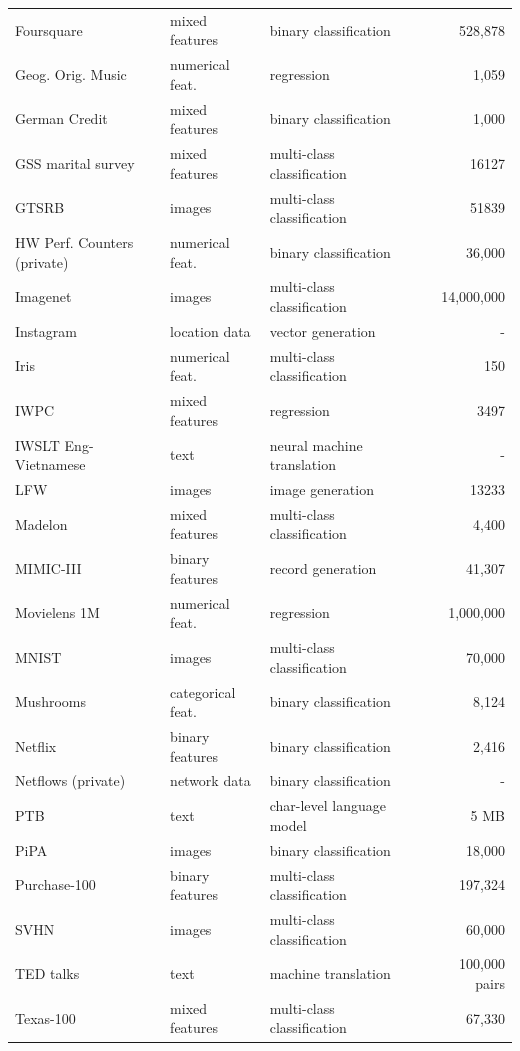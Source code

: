 \begin{table}[!t]
\begin{tabular}{p{3cm} p{2cm} p{3.2cm} p{2.5cm} r}
Foursquare~ & mixed features & binary classification &  & 528,878 \\
Geog. Orig. Music~ & numerical feat. & regression &  & 1,059 \\
German Credit~ & mixed features & binary classification &  & 1,000 \\
GSS marital survey~ & mixed features & multi-class classification &  & 16127 \\
GTSRB~ & images & multi-class classification &  & 51839\\
HW Perf. Counters (private) & numerical feat. & binary classification &  & 36,000 \\
Imagenet~ & images & multi-class classification &  & 14,000,000 \\
Instagram~ & location data & vector generation &  & - \\
Iris~ & numerical feat. & multi-class classification &  & 150 \\
IWPC~ & mixed features & regression &  & 3497 \\
IWSLT Eng-Vietnamese~ & text & neural machine translation &  & - \\
LFW~& images & image generation &  & 13233 \\ 
Madelon~ & mixed features & multi-class classification &  & 4,400 \\
MIMIC-III~ & binary features & record generation &  & 41,307 \\
Movielens 1M~ & numerical feat. & regression &  & 1,000,000 \\
MNIST~ & images & multi-class classification &  & 70,000 \\
Mushrooms~ & categorical feat. & binary classification &  & 8,124 \\
Netflix~ & binary features & binary classification &  & 2,416 \\
Netflows (private) & network data & binary classification &  & - \\
PTB~ & text & char-level language model &  & 5 MB \\
PiPA~ & images & binary classification &  & 18,000 \\
Purchase-100~ & binary features & multi-class classification &  & 197,324 \\
SVHN~ & images & multi-class classification &  & 60,000 \\
TED talks~ & text & machine translation &  & 100,000 pairs \\
Texas-100~ & mixed features & multi-class classification &  & 67,330 \\ 

\end{tabular}
\end{table}
